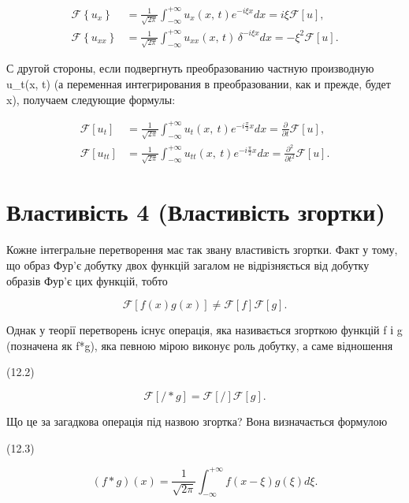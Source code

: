 \documentclass[
]{article}
\begin{document}
\[
\begin{split} \mathcal{F}\left\{u_{x}\right\} &= \frac{1}{\sqrt{2\pi}} \int_{-\infty}^{+\infty} u_{x}\left(x,\,t\right) e^{-i\xi x} dx = i\xi \mathcal{F}\left[u\right], \\ \mathcal{F}\left\{u_{xx}\right\} &= \frac{1}{\sqrt{2\pi}} \int_{-\infty}^{+\infty} u_{xx}\left(x,\,t\right) \, \delta^{-i\xi x} dx = -\xi^{2} \mathcal{F}\left[u\right]. \end{split}
\]

С другой стороны, если подвергнуть преобразованию частную производную
u\_t(x, t) (а переменная интегрирования в преобразовании, как и прежде,
будет x), получаем следующие формулы:

\[
\begin{aligned} \mathcal{F}\left[u_{t}\right] &= \frac{1}{\sqrt{2\pi}} \int_{-\infty}^{+\infty} u_{t}\left(x, \ t\right) e^{-i\frac{\pi}{2}x} dx = \frac{\partial}{\partial t} \mathcal{F}\left[u\right], \\ \mathcal{F}\left[u_{tt}\right] &= \frac{1}{\sqrt{2\pi}} \int_{-\infty}^{+\infty} u_{tt}\left(x, \ t\right) e^{-i\frac{\pi}{2}x} dx = \frac{\partial^{2}}{\partial t^{2}} \mathcal{F}\left[u\right]. \end{aligned}
\]

\section{Властивість 4 (Властивість
згортки)}\label{ux432ux43bux430ux441ux442ux438ux432ux456ux441ux442ux44c-4-ux432ux43bux430ux441ux442ux438ux432ux456ux441ux442ux44c-ux437ux433ux43eux440ux442ux43aux438}

Кожне інтегральне перетворення має так звану властивість згортки. Факт у
тому, що образ Фур'є добутку двох функцій загалом не відрізняється від
добутку образів Фур'є цих функцій, тобто

\[
\mathcal{F}[f(x)g(x)] \neq \mathcal{F}[f]\mathcal{F}[g].
\]

Однак у теорії перетворень існує операція, яка називається згорткою
функцій f і g (позначена як f*g), яка певною мірою виконує роль добутку,
а саме відношення

(12.2)

\[
\mathcal{F}[/*g] = \mathcal{F}[/]\mathcal{F}[g].
\]

Що це за загадкова операція під назвою згортка? Вона визначається
формулою

(12.3)

\[
(f*g)(x) = \frac{1}{\sqrt{2\pi}} \int_{-\infty}^{+\infty} f(x-\xi) g(\xi) d\xi.
\]
\end{document}
